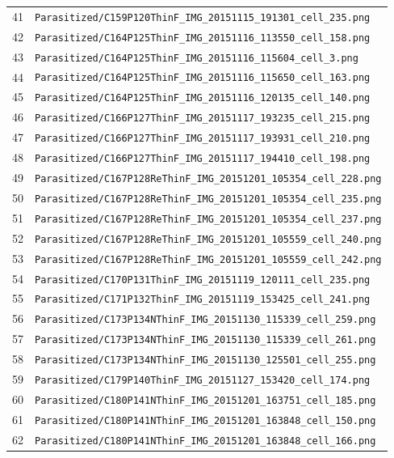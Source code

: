 \begin{longtable}{r p{12cm}}
41 & \texttt{Parasitized/C159P120ThinF\_IMG\_20151115\_191301\_cell\_235.png} \\
42 & \texttt{Parasitized/C164P125ThinF\_IMG\_20151116\_113550\_cell\_158.png} \\
43 & \texttt{Parasitized/C164P125ThinF\_IMG\_20151116\_115604\_cell\_3.png} \\
44 & \texttt{Parasitized/C164P125ThinF\_IMG\_20151116\_115650\_cell\_163.png} \\
45 & \texttt{Parasitized/C164P125ThinF\_IMG\_20151116\_120135\_cell\_140.png} \\
46 & \texttt{Parasitized/C166P127ThinF\_IMG\_20151117\_193235\_cell\_215.png} \\
47 & \texttt{Parasitized/C166P127ThinF\_IMG\_20151117\_193931\_cell\_210.png} \\
48 & \texttt{Parasitized/C166P127ThinF\_IMG\_20151117\_194410\_cell\_198.png} \\
49 & \texttt{Parasitized/C167P128ReThinF\_IMG\_20151201\_105354\_cell\_228.png} \\
50 & \texttt{Parasitized/C167P128ReThinF\_IMG\_20151201\_105354\_cell\_235.png} \\
51 & \texttt{Parasitized/C167P128ReThinF\_IMG\_20151201\_105354\_cell\_237.png} \\
52 & \texttt{Parasitized/C167P128ReThinF\_IMG\_20151201\_105559\_cell\_240.png} \\
53 & \texttt{Parasitized/C167P128ReThinF\_IMG\_20151201\_105559\_cell\_242.png} \\
54 & \texttt{Parasitized/C170P131ThinF\_IMG\_20151119\_120111\_cell\_235.png} \\
55 & \texttt{Parasitized/C171P132ThinF\_IMG\_20151119\_153425\_cell\_241.png} \\
56 & \texttt{Parasitized/C173P134NThinF\_IMG\_20151130\_115339\_cell\_259.png} \\
57 & \texttt{Parasitized/C173P134NThinF\_IMG\_20151130\_115339\_cell\_261.png} \\
58 & \texttt{Parasitized/C173P134NThinF\_IMG\_20151130\_125501\_cell\_255.png} \\
59 & \texttt{Parasitized/C179P140ThinF\_IMG\_20151127\_153420\_cell\_174.png} \\
60 & \texttt{Parasitized/C180P141NThinF\_IMG\_20151201\_163751\_cell\_185.png} \\
61 & \texttt{Parasitized/C180P141NThinF\_IMG\_20151201\_163848\_cell\_150.png} \\
62 & \texttt{Parasitized/C180P141NThinF\_IMG\_20151201\_163848\_cell\_166.png} \\

\end{longtable}
